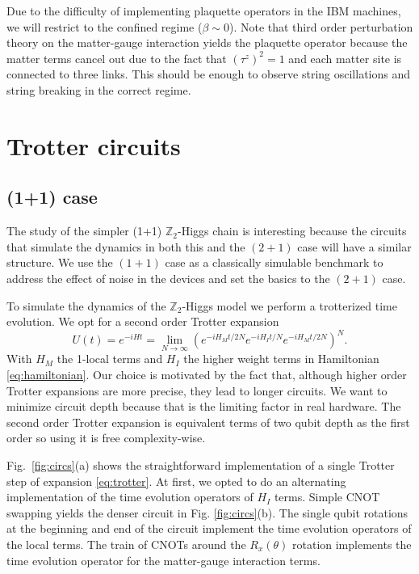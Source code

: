 \documentclass[a4paper]{article}
\begin{document}
Due to the difficulty of implementing plaquette operators in the IBM machines, we will restrict to the confined regime ($\beta \sim 0$). Note that third order perturbation theory on the matter-gauge interaction yields the plaquette operator because the matter terms cancel out due to the fact that $(\tau^z)^2 = 1$ and each matter site is connected to three links. This should be enough to observe string oscillations and string breaking in the correct regime.

\section{Trotter circuits}

\subsection{(1+1) case}

The study of the simpler (1+1) $\mathbb{Z}_2$-Higgs chain is interesting because the circuits that simulate the dynamics in both this and the $(2+1)$ case will have a similar structure. We use the $(1+1)$ case as a classically simulable benchmark to address the effect of noise in the devices and set the basics to the $(2+1)$ case.

To simulate the dynamics of the $\mathbb{Z}_2$-Higgs model we perform a trotterized time evolution. We opt for a second order Trotter expansion
%
\begin{equation}
    U(t) = e^{-i H t} = \lim_{N \to \infty}\left( e^{-i H_M t/2N} e^{-i H_I t/N} e^{-i H_M t/2N} \right)^N.
    \label{eq:trotter}
\end{equation}
%
With $H_M$ the 1-local terms and $H_I$ the higher weight terms in Hamiltonian \eqref{eq:hamiltonian}. Our choice is motivated by the fact that, although higher order Trotter expansions are more precise, they lead to longer circuits. We want to minimize circuit depth because that is the limiting factor in real hardware. The second order Trotter expansion is equivalent terms of two qubit depth as the first order so using it is free complexity-wise.

Fig.~\ref{fig:circs}(a) shows the straightforward implementation of a single Trotter step of expansion \eqref{eq:trotter}. At first, we opted to do an alternating implementation of the time evolution operators of $H_I$ terms. Simple CNOT swapping yields the denser circuit in Fig. \ref{fig:circs}(b). The single qubit rotations at the beginning and end of the circuit implement the time evolution operators of the local terms. The train of CNOTs around the $R_x(\theta)$ rotation implements the time evolution operator for the matter-gauge interaction terms.
\end{document}
